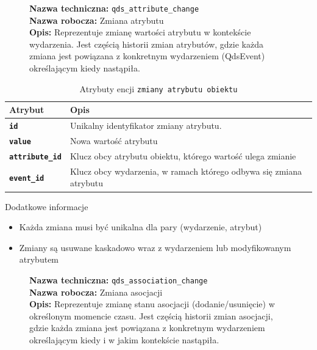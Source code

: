 \begin{figure}[H]
    \centering
    \begin{minipage}{0.8\textwidth} 
        \begin{framed}
            \noindent\textbf{\large Nazwa techniczna:} \texttt{qds\_attribute\_change} \\
            \textbf{\large Nazwa robocza:} Zmiana atrybutu \\
            \textbf{\large Opis:} Reprezentuje zmianę wartości atrybutu w kontekście wydarzenia.
            Jest częścią historii zmian atrybutów, gdzie każda zmiana jest powiązana
            z konkretnym wydarzeniem (QdsEvent) określającym kiedy nastąpiła.
        \end{framed}
    \end{minipage}
\end{figure}

\begin{table}[H]
    \centering
    \renewcommand{\arraystretch}{1.6}
    \begin{tabular}{|>{\bfseries}l|p{}|}
        \hline
        \rowcolor[HTML]{EFEFEF} \textbf{Atrybut} & \textbf{Opis} \\
        \hline
        \texttt{id} & Unikalny identyfikator zmiany atrybutu. \\
        \hline
        \texttt{value} & Nowa wartość atrybutu \\
        \hline
        \texttt{attribute\_id} & Klucz obcy atrybutu obiektu, którego wartość ulega zmianie \\
        \hline
        \texttt{event\_id} & Klucz obcy wydarzenia, w ramach którego odbywa się zmiana atrybutu \\
        \hline
    \end{tabular}
    \caption{Atrybuty encji \texttt{zmiany atrybutu obiektu}}
\end{table}

Dodatkowe informacje
\begin{itemize}
    \item Każda zmiana musi być unikalna dla pary (wydarzenie, atrybut)
    \item Zmiany są usuwane kaskadowo wraz z wydarzeniem lub modyfikowanym atrybutem
\end{itemize}

\begin{figure}[H]
    \centering
    \begin{minipage}{0.8\textwidth} 
        \begin{framed}
            \noindent\textbf{\large Nazwa techniczna:} \texttt{qds\_association\_change} \\
            \textbf{\large Nazwa robocza:} Zmiana asocjacji \\
            \textbf{\large Opis:} Reprezentuje zmianę stanu asocjacji (dodanie/usunięcie) w określonym momencie czasu.
            Jest częścią historii zmian asocjacji, gdzie każda zmiana jest powiązana z konkretnym
            wydarzeniem określającym kiedy i w jakim kontekście nastąpiła.
        \end{framed}
    \end{minipage}
\end{figure}

